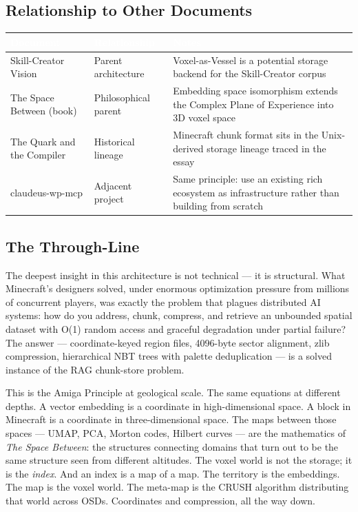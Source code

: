 \documentclass[11pt,letterpaper]{article}
\newcommand{\tableheader}[1]{\textbf{\sffamily\textcolor{white}{#1}}}
\begin{document}
\subsection{Relationship to Other Documents}

\begin{center}
\begin{tabularx}{\textwidth}{L{3.5cm}L{4cm}X}
\toprule
{}
\tableheader{Document} & \tableheader{Relationship} & \tableheader{Notes} \\
\midrule
Skill-Creator Vision & Parent architecture & Voxel-as-Vessel is a potential storage backend for the Skill-Creator corpus \\
The Space Between (book) & Philosophical parent & Embedding space isomorphism extends the Complex Plane of Experience into 3D voxel space \\
The Quark and the Compiler & Historical lineage & Minecraft chunk format sits in the Unix-derived storage lineage traced in the essay \\
claudeus-wp-mcp & Adjacent project & Same principle: use an existing rich ecosystem as infrastructure rather than building from scratch \\
\bottomrule
\end{tabularx}
\end{center}

\subsection{The Through-Line}

The deepest insight in this architecture is not technical --- it is structural. What Minecraft's designers solved, under enormous optimization pressure from millions of concurrent players, was exactly the problem that plagues distributed AI systems: how do you address, chunk, compress, and retrieve an unbounded spatial dataset with O(1) random access and graceful degradation under partial failure? The answer --- coordinate-keyed region files, 4096-byte sector alignment, zlib compression, hierarchical NBT trees with palette deduplication --- is a solved instance of the RAG chunk-store problem.

This is the Amiga Principle at geological scale. The same equations at different depths. A vector embedding is a coordinate in high-dimensional space. A block in Minecraft is a coordinate in three-dimensional space. The maps between those spaces --- UMAP, PCA, Morton codes, Hilbert curves --- are the mathematics of \textit{The Space Between}: the structures connecting domains that turn out to be the same structure seen from different altitudes. The voxel world is not the storage; it is the \textit{index}. And an index is a map of a map. The territory is the embeddings. The map is the voxel world. The meta-map is the CRUSH algorithm distributing that world across OSDs. Coordinates and compression, all the way down.
\end{document}

